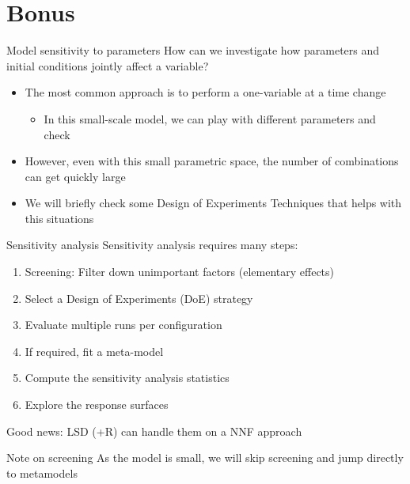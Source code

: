 \documentclass[bigger,aspectratio=169]{beamer}
\begin{document}
\section{Bonus}
\label{sec:org842c5fd}

\begin{frame}[label={sec:orgf076f15}]{Model sensitivity to parameters}
How can we investigate how parameters and initial conditions \alert{jointly} affect a variable?

\begin{itemize}
\item The most common approach is to perform a one-variable at a time change
\begin{itemize}
\item In this small-scale model, we can play with different parameters and check
\end{itemize}
\item However, even with this small parametric space, the number of combinations can get quickly large
\item We will briefly check some Design of Experiments Techniques that helps with this situations
\end{itemize}
\end{frame}
\begin{frame}[label={sec:org59d106a}]{Sensitivity analysis}
Sensitivity analysis requires many steps:

\begin{enumerate}
\item Screening: Filter down unimportant factors (elementary effects)
\item Select a \alert{Design of Experiments} (DoE) strategy
\item Evaluate multiple runs per configuration
\item If required, fit a \alert{meta-model}
\item Compute the sensitivity analysis \alert{statistics}
\item Explore the \alert{response surfaces}
\end{enumerate}

\alert{Good news:} LSD (+R) can handle them on a NNF approach
\begin{block}{Note on screening}
As the model is small, we will skip screening and jump directly to metamodels
\end{block}
\end{frame}
\end{document}
